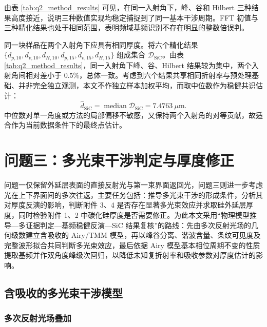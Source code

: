 \documentclass[withoutpreface,bwprint]{cumcmthesis}
\begin{document}
由表 \ref{tab:q2_method_results} 可见，在同一入射角下，峰、谷和 Hilbert 三种结果高度接近，说明三种数值实现均稳定捕捉到了同一基本干涉周期。FFT 初值与三种精化结果也处于相同范围，表明频域基频识别不存在明显的整数倍误判。

同一块样品在两个入射角下应具有相同厚度。将六个精化结果 $\{d_{p,10},d_{v,10},d_{H,10},d_{p,15},d_{v,15},d_{H,15}\}$ 组成集合 $\mathcal D_{\mathrm{SiC}}$。由表 \ref{tab:q2_method_results}，同一入射角下峰、谷、Hilbert 结果较为集中，两个入射角间相对差小于 $0.5\%$，总体一致。考虑到六个结果共享相同折射率与预处理基础、并非完全独立观测，本文不作独立样本加权平均，而取中位数作为稳健共识估计：
\begin{equation}
	\widehat d_{\mathrm{SiC}}
	=
	\operatorname{median}\mathcal D_{\mathrm{SiC}}
	=
	7.4763\ \mu\mathrm{m}.
	\label{eq:q2_final_point_estimate}
\end{equation}
中位数对单一角度或方法的局部偏移不敏感，又保持两个入射角的对等贡献，故适合作为当前数据条件下的最终点估计。


\section{问题三：多光束干涉判定与厚度修正}

问题一仅保留外延层表面的直接反射光与第一束界面返回光，问题三则进一步考虑光在上下界面间的多次往返，主要任务包括：推导多光束干涉的形成条件，分析其对厚度反演的影响，判断附件 3、4 是否存在显著多光束效应并求取硅外延层厚度，同时检验附件 1、2 中碳化硅厚度是否需要修正。为此本文采用“物理模型推导—多证据判定—基频稳健反演—SiC 结果复核”的路线：先由多次反射光场的几何级数建立含吸收的 Airy/TMM 模型，再以峰谷分离、谐波含量、条纹可见度及完整波形拟合共同判断多光束效应，最后依据 Airy 模型基本相位周期不变的性质提取基频并作双角度峰级次回归，以降低未知复折射率和吸收参数对厚度估计的影响。

\subsection{含吸收的多光束干涉模型}
\label{subsec:q3_multibeam_model}

\subsubsection{多次反射光场叠加}
\end{document}
